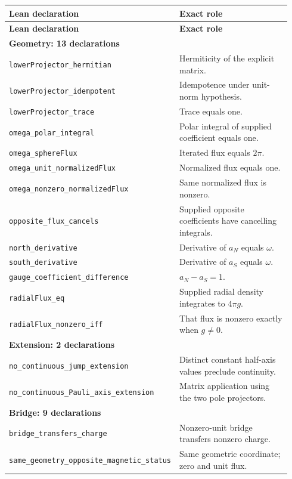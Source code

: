 \documentclass[11pt]{article}
\theoremstyle{definition}\newtheorem{definition}[theorem]{Definition}
\theoremstyle{remark}\newtheorem{remark}[theorem]{Remark}
\begin{document}
\begin{longtable}{p{0.49\linewidth}p{0.45\linewidth}}
\toprule\textbf{Lean declaration} & \textbf{Exact role}\\\midrule\endfirsthead
\toprule\textbf{Lean declaration} & \textbf{Exact role}\\\midrule\endhead
\multicolumn{2}{l}{\textbf{Geometry: 13 declarations}}\\
\texttt{lowerProjector\_hermitian} & Hermiticity of the explicit matrix.\\
\texttt{lowerProjector\_idempotent} & Idempotence under unit-norm hypothesis.\\
\texttt{lowerProjector\_trace} & Trace equals one.\\
\texttt{omega\_polar\_integral} & Polar integral of supplied coefficient equals one.\\
\texttt{omega\_sphereFlux} & Iterated flux equals $2\pi$.\\
\texttt{omega\_unit\_normalizedFlux} & Normalized flux equals one.\\
\texttt{omega\_nonzero\_normalizedFlux} & Same normalized flux is nonzero.\\
\texttt{opposite\_flux\_cancels} & Supplied opposite coefficients have cancelling integrals.\\
\texttt{north\_derivative} & Derivative of $a_N$ equals $\omega$.\\
\texttt{south\_derivative} & Derivative of $a_S$ equals $\omega$.\\
\texttt{gauge\_coefficient\_difference} & $a_N-a_S=1$.\\
\texttt{radialFlux\_eq} & Supplied radial density integrates to $4\pi g$.\\
\texttt{radialFlux\_nonzero\_iff} & That flux is nonzero exactly when $g\neq0$.\\\midrule
\multicolumn{2}{l}{\textbf{Extension: 2 declarations}}\\
\texttt{no\_continuous\_jump\_extension} & Distinct constant half-axis values preclude continuity.\\
\texttt{no\_continuous\_Pauli\_axis\_extension} & Matrix application using the two pole projectors.\\\midrule
\multicolumn{2}{l}{\textbf{Bridge: 9 declarations}}\\
\texttt{bridge\_transfers\_charge} & Nonzero-unit bridge transfers nonzero charge.\\
\texttt{same\_geometry\_opposite\_magnetic\_status} & Same geometric coordinate; zero and unit flux.\\

\end{longtable}
\end{document}
